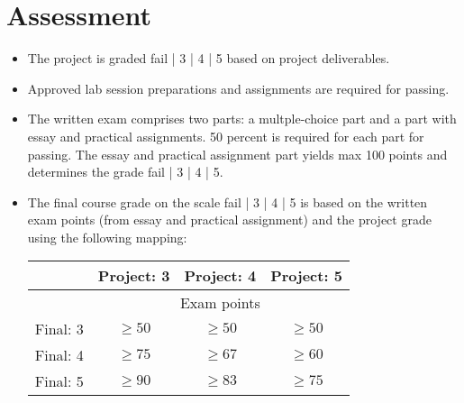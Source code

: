 \section{Assessment}
\begin{itemize}
\item The project is graded fail | 3 | 4 | 5 based on project deliverables.
\item Approved lab session preparations and assignments are required for passing.
\item The written exam comprises two parts: a multple-choice part and a part with essay and practical assignments. 50 percent is required for each part for passing. The essay and practical assignment part yields max 100 points and determines the grade fail | 3 | 4 | 5.
\item The final course grade on the scale fail | 3 | 4 | 5 is based on the written exam points (from essay and practical assignment) and the project grade using the following mapping: 

\begin{tabular}{r | c c c}
 & Project: 3 & Project: 4 & Project: 5 \\
\hline
 & \multicolumn{3}{c}{Exam points}    \\
Final: 3 & $ \geq 50$ & $\geq 50$ & $\geq 50$ \\
Final: 4 & $ \geq 75$ & $\geq 67$ & $\geq 60$ \\
Final: 5 & $ \geq 90$ & $\geq 83$ & $\geq 75$ \\
\hline
\end{tabular}


\end{itemize}

\ifteknolog\else
\newpage
\fi

